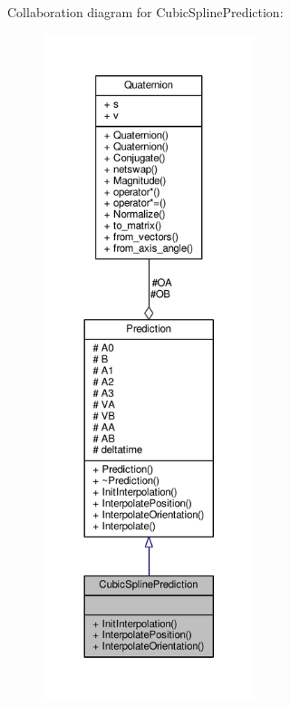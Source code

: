 Collaboration diagram for Cubic\+Spline\+Prediction\+:
\nopagebreak
\begin{figure}[H]
\begin{center}
\leavevmode
\includegraphics[height=550pt]{d4/daf/classCubicSplinePrediction__coll__graph}
\end{center}
\end{figure}
